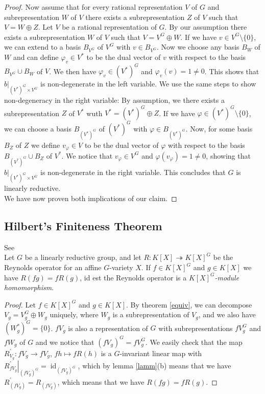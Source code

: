 \begin{proof}
  Now assume that for every rational representation $V$ of $G$ and subrepresentation $W$ of $V$ there exists a subrepresentation $Z$ of $V$ such that $V = W \oplus Z$.
  Let $V$ be a rational representation of $G$.
  By our assumption there exists a subrepresentation $W$ of $V$ such that $V = V^G \oplus W$.
  If we have $v \in V^G \setminus \{0\}$, we can extend to a basis $B_{V^G}$ of $V^G$ with $v \in B_{V^G}$.
  Now we choose any basis $B_W$ of $W$ and can define $\varphi_v \in V^\ast$ to be the dual vector of $v$ with respect to the basis $B_{V^G} \cup B_W$ of $V$.
  We then have $\varphi_v \in (V^\ast)^G $ and $\varphi_v (v) = 1 \neq 0$.
  This shows that $\left. b\right|_{(V^\ast)^G \times V^G}$ is non-degenerate in the left variable.
  We use the same steps to show non-degeneracy in the right variable:
  By assumption, we there exists a subrepresentation $Z$ of $V^\ast$ wuth $V^\ast = (V^\ast)^G \oplus Z$.
  If we have $\varphi \in (V^\ast)^G \setminus\{0\}$, we can choose a basis $B_{(V^\ast)^G}$ of $(V^\ast)^G$ with $\varphi \in B_{(V^\ast)^G}$.
  Now, for some basis $B_Z$ of $Z$ we define $v_\varphi \in V$ to be the dual vector of $\varphi$ with respect to the basis $B_{(V^\ast)^G}\cup B_Z$ of $V^\ast$.
  We notice that $v_\varphi \in V^G$ and $\varphi(v_\varphi) = 1 \neq 0$, showing that $\left. b\right|_{(V^\ast)^G \times V^G}$ is non-degenerate in the right variable.
  This concludes that $G$ is linearly reductive.\\
  We have now proven both implications of our claim.
\end{proof}

\subsection{Hilbert's Finiteness Theorem}

\begin{proposition}
  See \cite[p.41 Corollary 2.2.7]{DK15}\\
  Let $G$ be a linearly reductive group, and let $ R \colon K[X] \twoheadrightarrow K[X]^G $ be the Reynolds operator for an affine $G$-variety $X$.
  If $f \in K[X]^G$ and $g \in K[X]$ we have $R(fg) = fR(g)$, id est the Reynolds operator is a \textit{$K[X]^G$-module homomorphism}.
\end{proposition}

\begin{proof}
  Let $f \in K[X]^G$ and $g \in K[X]$.
  By theorem \ref{equiv}, we can decompose $V_g = V_g^G \oplus W_g$ uniquely, where $W_g$ is a subrepresentation of $V_g$, and we also have $(W_g^\ast)^G = \{0\}$.
  $fV_g$ is also a representation of $G$ with subrepresentations $fV_g^G$ and $fW_g$ of $G$ and we notice that $(fV_g)^G = fV_g^G$.
  We easily check that the map $R_{V_g}^\prime \colon fV_g \rightarrow fV_g$, $fh \mapsto f R(h)$ is a $G$-invariant linear map with $\left. R_{fV_g}^\prime \right|_{(fV_g)^G} = \operatorname{id}_{(fV_g)^G}$, which by lemma \ref{lamm}(b) means that we have $R_{(fV_g)}^\prime = R_{(fV_g)}$, which means that we have $R(fg) = fR(g)$.
\end{proof}

